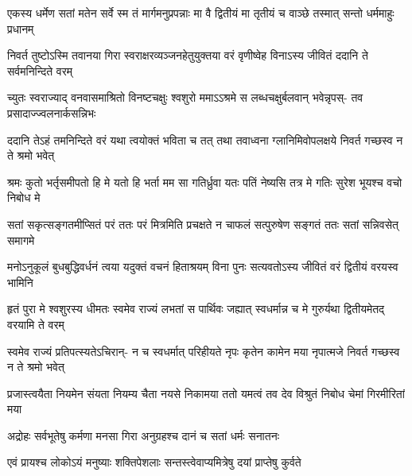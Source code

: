 \begin{center}
\fourlineindentedshloka
{एकस्य धर्मेण सतां मतेन}
{सर्वे स्म तं मार्गमनुप्रपन्नाः}
{मा वै द्वितीयं मा तृतीयं च वाञ्छे}
{तस्मात् सन्तो धर्ममाहुः प्रधानम्}


\fourlineindentedshloka
{निवर्त तुष्टोऽस्मि तवानया गिरा}
{स्वराक्षरव्यञ्जनहेतुयुक्तया}
{वरं वृणीष्वेह विनाऽस्य जीवितं}
{ददानि ते सर्वमनिन्दिते वरम्}


\fourlineindentedshloka
{च्युतः स्वराज्याद् वनवासमाश्रितो}
{विनष्टचक्षुः श्वशुरो ममाऽऽश्रमे}
{स लब्धचक्षुर्बलवान् भवेन्नृपस्-}
{तव प्रसादाज्ज्वलनार्कसन्निभः}


\fourlineindentedshloka
{ददानि तेऽहं तमनिन्दिते वरं}
{यथा त्वयोक्तं भविता च तत् तथा}
{तवाध्वना ग्लानिमिवोपलक्षये}
{निवर्त गच्छस्व न ते श्रमो भवेत्}


\fourlineindentedshloka
{श्रमः कुतो भर्तृसमीपतो हि मे}
{यतो हि भर्ता मम सा गतिर्ध्रुवा}
{यतः पतिं नेष्यसि तत्र मे गतिः}
{सुरेश भूयश्च वचो निबोध मे}

\fourlineindentedshloka
{सतां सकृत्सङ्गतमीप्सितं परं}
{ततः परं मित्रमिति प्रचक्षते}
{न चाफलं सत्पुरुषेण सङ्गतं}
{ततः सतां सन्निवसेत् समागमे}


\fourlineindentedshloka
{मनोऽनुकूलं बुधबुद्धिवर्धनं}
{त्वया यदुक्तं वचनं हिताश्रयम्}
{विना पुनः सत्यवतोऽस्य जीवितं}
{वरं द्वितीयं वरयस्व भामिनि}


\fourlineindentedshloka
{हृतं पुरा मे श्वशुरस्य धीमतः}
{स्वमेव राज्यं लभतां स पार्थिवः}
{जह्यात् स्वधर्मान्न च मे गुरुर्यथा}
{द्वितीयमेतद् वरयामि ते वरम्}



\fourlineindentedshloka
{स्वमेव राज्यं प्रतिपत्स्यतेऽचिरान्-}
{न च स्वधर्मात् परिहीयते नृपः}
{कृतेन कामेन मया नृपात्मजे}
{निवर्त गच्छस्व न ते श्रमो भवेत्}


\fourlineindentedshloka
{प्रजास्त्वयैता नियमेन संयता}
{नियम्य चैता नयसे निकामया}
{ततो यमत्वं तव देव विश्रुतं}
{निबोध चेमां गिरमीरितां मया}

\twolineshloka
{अद्रोहः सर्वभूतेषु कर्मणा मनसा गिरा}
{अनुग्रहश्च दानं च सतां धर्मः सनातनः}

\twolineshloka
{एवं प्रायश्च लोकोऽयं मनुष्याः शक्तिपेशलाः}
{सन्तस्त्वेवाप्यमित्रेषु दयां प्राप्तेषु कुर्वते}


\end{center}
